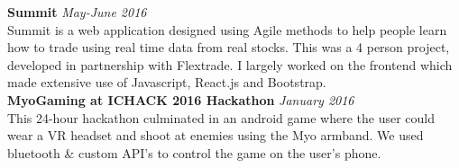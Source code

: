 \documentclass[a4paper,10pt]{article}
\begin{document}
	 \textbf{Summit} \hfill \textit{May-June 2016} \\ 
	 Summit is a web application designed using Agile methods to help people learn how to trade using real time data from real stocks. This was a 4 person project, developed in partnership with Flextrade. I largely worked on the frontend which made extensive use of Javascript, React.js and Bootstrap. \\
	
	
	\textbf{MyoGaming at ICHACK 2016 Hackathon} \hfill \textit{January 2016} \\
	This 24-hour hackathon culminated in an android game where the user could wear a VR headset and shoot at enemies using the Myo armband. We used bluetooth \& custom API's to control the game on the user's phone.

	
	
	
\end{document}

